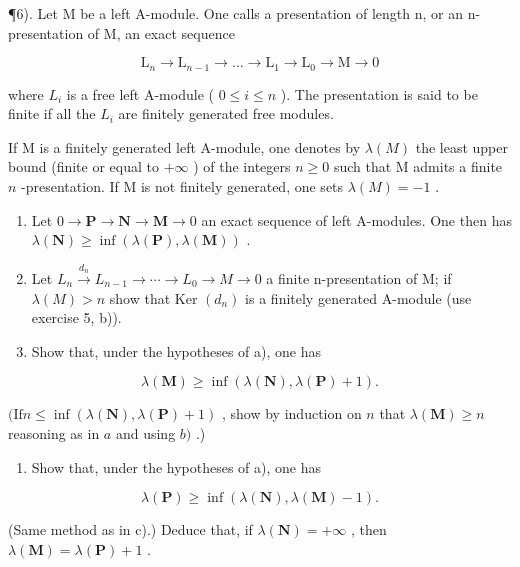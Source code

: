 ¶6). Let M be a left A-module. One calls a presentation of length n, or an n-presentation of M, an exact sequence

\[
\mathrm{L} _ {n} \rightarrow \mathrm{L} _ {n - 1} \rightarrow \dots \rightarrow \mathrm{L} _ {1} \rightarrow \mathrm{L} _ {0} \rightarrow \mathrm{M} \rightarrow 0
\]

where \(L_{i}\) is a free left A-module ( \(0 \leqslant i \leqslant n\) ). The presentation is said to be finite if all the \(L_{i}\) are finitely generated free modules.

If M is a finitely generated left A-module, one denotes by \(\lambda(M)\) the least upper bound (finite or equal to \(+\infty\) ) of the integers \(n \geqslant 0\) such that M admits a finite \(n\) -presentation. If M is not finitely generated, one sets \(\lambda(M) = -1\) .

\begin{enumerate}
\def\labelenumi{\alph{enumi})}
\item
  Let \(0 \to \mathbf{P} \to \mathbf{N} \to \mathbf{M} \to 0\) an exact sequence of left A-modules. One then has \(\lambda(\mathbf{N}) \geqslant \inf (\lambda(\mathbf{P}), \lambda(\mathbf{M}))\) .
\item
  Let \(L_{n} \xrightarrow{d_{n}} L_{n-1} \to \cdots \to L_{0} \to M \to 0\) a finite n-presentation of M; if \(\lambda(M) > n\) show that Ker \((d_{n})\) is a finitely generated A-module (use exercise 5, b)).
\item
  Show that, under the hypotheses of a), one has
\end{enumerate}

\[
\lambda (\mathbf {M}) \geqslant \inf \left(\lambda (\mathbf {N}), \lambda (\mathbf {P}) + 1\right).
\]

\((\mathrm{If} n \leqslant \inf (\lambda(\mathbf{N}), \lambda(\mathbf{P}) + 1)\) , show by induction on \(n\) that \(\lambda(\mathbf{M}) \geqslant n\) reasoning as in \(a\) and using \(b)\) .)

\begin{enumerate}
\def\labelenumi{\alph{enumi})}
\setcounter{enumi}{3}
\tightlist
\item
  Show that, under the hypotheses of a), one has
\end{enumerate}

\[
\lambda (\mathbf {P}) \geqslant \inf \left(\lambda (\mathbf {N}), \lambda (\mathbf {M}) - 1\right).
\]

(Same method as in c).) Deduce that, if \(\lambda(\mathbf{N}) = +\infty\) , then \(\lambda(\mathbf{M}) = \lambda(\mathbf{P}) + 1\) .

